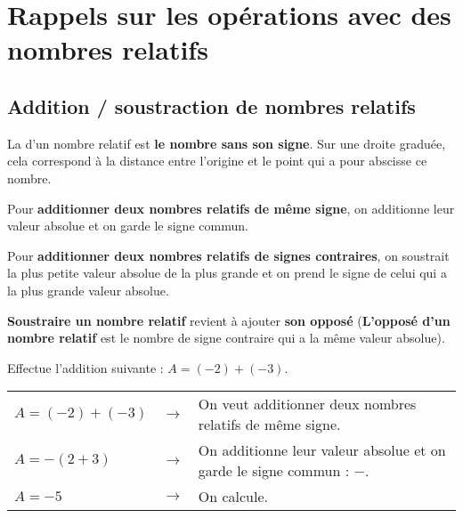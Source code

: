 \section{Rappels sur les opérations avec des nombres relatifs}

\subsection{Addition / soustraction de nombres relatifs}

\begin{rappel}
La  d'un nombre relatif est \textbf{le nombre sans son signe}. Sur une droite graduée, cela correspond à la distance entre l'origine et le point qui a pour abscisse ce nombre.
\end{rappel}


\begin{aconnaitre}
Pour \textbf{additionner deux nombres relatifs de même signe}, on additionne leur valeur absolue et on garde le signe commun.

Pour \textbf{additionner deux nombres relatifs de signes contraires}, on soustrait la plus petite valeur absolue de la plus grande et on prend le signe de celui qui a la plus grande valeur absolue.

\textbf{Soustraire un nombre relatif} revient à ajouter \textbf{son opposé} (\textbf{L'opposé d'un nombre relatif} est le nombre de signe contraire qui a la même valeur absolue).
\end{aconnaitre}


\begin{exemple*1}
Effectue l'addition suivante : $A = (-2) +(-3)$. 

\correction

\begin{tabular}{lcl}
$A = (-2) +(-3)$ & $\rightarrow$ & On veut additionner deux nombres relatifs de même signe. \\
$A = -(2 +3)$ & $\rightarrow$ & On additionne leur valeur absolue et on garde le signe commun : $-$. \\
$A = -5 $ & $\rightarrow$ &  On calcule. \\
\end{tabular}

\end{exemple*1}





